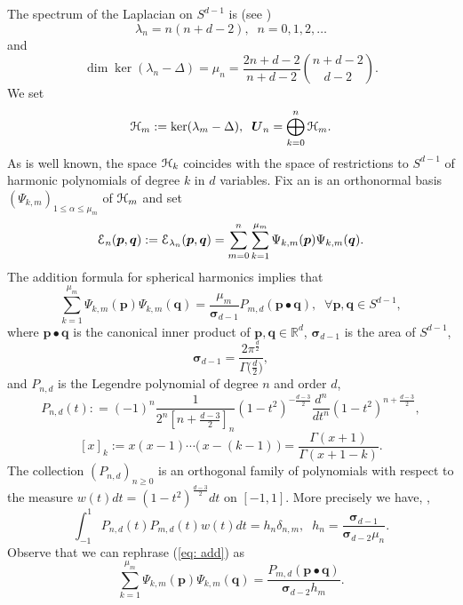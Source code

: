 \documentclass[reqno, 11pt]{amsart}
\theoremstyle{definition}
\numberwithin{equation}{section}
\begin{document}
 The spectrum of the Laplacian on $S^{d-1}$ is  (see \cite{Mu})
\[
\lambda_n= n(n+d-2),\;\;n=0,1,2,\dotsc
\]
and
\[
\dim \ker(\lambda_n-\Delta)= \mu_n=\frac{2n+d-2}{n+d-2}\binom{n+d-2}{d-2}.
\]
We set
\[
{\EuScript H}_m:=\ker  (\lambda_m-\Delta),\;\;{{\boldsymbol{U}}}_n=\bigoplus_{k=0}^{n} {\EuScript H}_m.
\]
As is well known, the   space  ${\EuScript H}_k$ coincides with the space of restrictions to   $S^{d-1}$ of harmonic polynomials  of  degree $k$ in $d$ variables.   Fix  an   is an orthonormal basis $(\Psi_{k, m})_{1\leq \alpha\leq \mu_m}$ of  ${\EuScript H}_m$   and set
\[
{\EuScript{E}}_n({{\boldsymbol{p}}},{{\boldsymbol{q}}}):={\EuScript{E}}_{\lambda_n}({{\boldsymbol{p}}},{{\boldsymbol{q}}})=\sum_{m=0}^n \sum_{k=1}^{\mu_m}\Psi_{k,m}({{\boldsymbol{p}}})\Psi_{k,m}({{\boldsymbol{q}}}).
\]
The addition formula  for spherical harmonics \cite{Mu} implies that
\begin{equation}
\sum_{k=1}^{\mu_m} \Psi_{k,m}({{\boldsymbol{p}}})\Psi_{k,m}({{\boldsymbol{q}}})=\frac{\mu_m}{{\boldsymbol{\sigma}}_{d-1}} P_{m,d}({{\boldsymbol{p}}}\bullet{{\boldsymbol{q}}}),\;\;\forall   {{\boldsymbol{p}}},{{\boldsymbol{q}}}\in S^{d-1},
\label{eq: add}
\end{equation}
where ${{\boldsymbol{p}}}\bullet {{\boldsymbol{q}}}$ is the  canonical inner product of ${{\boldsymbol{p}}},{{\boldsymbol{q}}}\in {{\mathbb R}}^d$,  ${\boldsymbol{\sigma}}_{d-1}$ is the area of $S^{d-1}$,
\begin{equation}
{\boldsymbol{\sigma}}_{d-1}=\frac{2\pi^{\frac{d}{2}}}{\Gamma\bigl(\frac{d}{2}\bigr)},
\label{eq: bsi}
\end{equation}
and $P_{n,d}$ is the Legendre polynomial  of degree $n$ and order $d$,
\[
P_{n,d}(t): =(-1)^n\frac{1}{2^n [n+\frac{d-3}{2}]_n }(1-t^2)^{-\frac{d-3}{2}}\frac{d^n}{dt^n}(1-t^2)^{n+\frac{d-3}{2}},
\]
\[
[x]_k:= x(x-1)\cdots \bigl(\,x-(k-1)\,\bigr)=\frac{\Gamma(x+1)}{\Gamma(x+1-k)}.
\]
The collection   $(P_{n,d})_{n\geq 0}$ is an orthogonal family of  polynomials with respect to the  measure $ w(t)dt=(1-t^2)^{\frac{d-3}{2}}dt$ on  $[-1,1]$.  More precisely we have, \cite[\S 2]{Mu},
\[
\int_{-1}^1  P_{n,d}(t) P_{m,d}(t) w(t) dt =  h_n \delta_{n,m},\;\;h_n=\frac{{\boldsymbol{\sigma}}_{d-1}}{{\boldsymbol{\sigma}}_{d-2}\mu_n}.
\]
Observe that we can rephrase (\ref{eq: add}) as
\begin{equation}
\sum_{k=1}^{\mu_m}\Psi_{k,m}({{\boldsymbol{p}}})\Psi_{k,m}({{\boldsymbol{q}}})=\frac{P_{m,d}({{\boldsymbol{p}}}\bullet{{\boldsymbol{q}}})}{{\boldsymbol{\sigma}}_{d-2}h_m}.
\label{eq: add1}
\end{equation}
\end{document}
